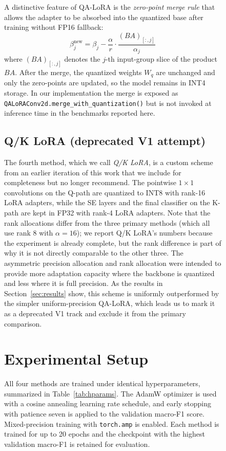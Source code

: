 \documentclass[conference]{IEEEtran}
\begin{document}
\begin{figure}[htbp]
A distinctive feature of QA-LoRA is the \emph{zero-point merge rule} that allows the adapter to be absorbed into the quantized base after training without FP16 fallback:
\begin{equation}
\beta_j^{\text{new}} = \beta_j - \frac{\alpha}{r} \cdot \frac{(B A)_{[:,j]}}{\alpha_j}
\end{equation}
where $(BA)_{[:,j]}$ denotes the $j$-th input-group slice of the product $BA$. After the merge, the quantized weights $W_q$ are unchanged and only the zero-points are updated, so the model remains in INT4 storage. In our implementation the merge is exposed as \texttt{QALoRAConv2d.merge\_with\_quantization()} but is not invoked at inference time in the benchmarks reported here.

\subsection{Q/K LoRA (deprecated V1 attempt)}
The fourth method, which we call \emph{Q/K LoRA}, is a custom scheme from an earlier iteration of this work that we include for completeness but no longer recommend. The pointwise $1\times 1$ convolutions on the Q-path are quantized to INT8 with rank-16 LoRA adapters, while the SE layers and the final classifier on the K-path are kept in FP32 with rank-4 LoRA adapters. Note that the rank allocations differ from the three primary methods (which all use rank 8 with $\alpha=16$); we report Q/K LoRA's numbers because the experiment is already complete, but the rank difference is part of why it is not directly comparable to the other three. The asymmetric precision allocation and rank allocation were intended to provide more adaptation capacity where the backbone is quantized and less where it is full precision. As the results in Section~\ref{sec:results} show, this scheme is uniformly outperformed by the simpler uniform-precision QA-LoRA, which leads us to mark it as a deprecated V1 track and exclude it from the primary comparison.

\section{Experimental Setup}
All four methods are trained under identical hyperparameters, summarized in Table~\ref{tab:hparams}. The AdamW optimizer is used with a cosine annealing learning rate schedule, and early stopping with patience seven is applied to the validation macro-F1 score. Mixed-precision training with \texttt{torch.amp} is enabled. Each method is trained for up to 20 epochs and the checkpoint with the highest validation macro-F1 is retained for evaluation.


\end{figure}
\end{document}
